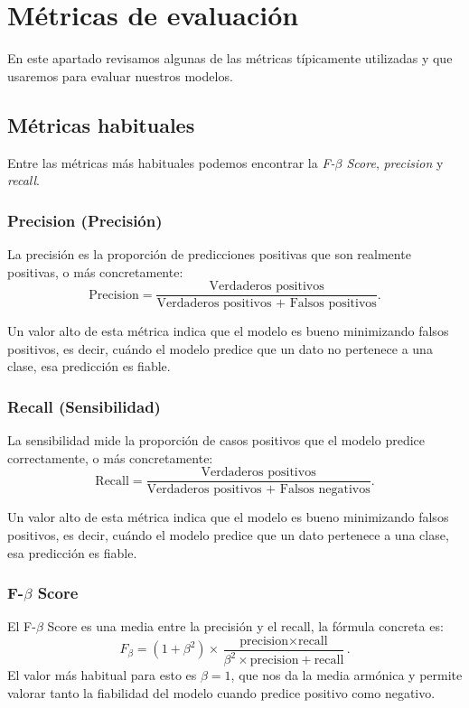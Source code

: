 \section{Métricas de evaluación}
En este apartado revisamos algunas de las métricas típicamente utilizadas y que usaremos para evaluar nuestros modelos.

\subsection{Métricas habituales}
Entre las métricas más habituales podemos encontrar la \emph{F-$\beta$ Score}, \emph{precision} y \emph{recall}.

\subsubsection{Precision (Precisión)}
La precisión es la proporción de predicciones positivas que son realmente positivas, o más concretamente:
\[
\text{Precision} = \frac{\text{Verdaderos positivos}}{\text{Verdaderos positivos + Falsos positivos}}.
\]

Un valor alto de esta métrica indica que el modelo es bueno minimizando falsos positivos, es decir, cuándo el modelo predice que un dato no pertenece a una clase, esa predicción es fiable.

\subsubsection{Recall (Sensibilidad)}
La sensibilidad mide la proporción de casos positivos que el modelo predice correctamente, o más concretamente:
\[
\text{Recall} = \frac{\text{Verdaderos positivos}}{\text{Verdaderos positivos + Falsos negativos}}.
\]

Un valor alto de esta métrica indica que el modelo es bueno minimizando falsos positivos, es decir, cuándo el modelo predice que un dato pertenece a una clase, esa predicción es fiable.

\subsubsection{F-$\beta$ Score}
El F-$\beta$ Score es una media entre la precisión y el recall, la fórmula concreta es:
\[
F_\beta = (1+\beta^2)\times \frac{\text{precision} \times \text{recall}}{\beta^2\times\text{precision} + \text{recall}}.
\]
El valor más habitual para esto es $\beta=1$, que nos da la media armónica y permite valorar tanto la fiabilidad del modelo cuando predice positivo como negativo.


